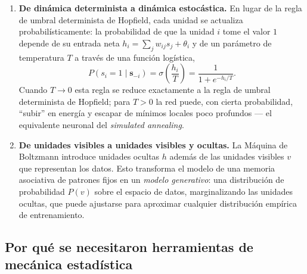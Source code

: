 \documentclass[12pt]{article}
\begin{document}
\begin{enumerate}
\item \textbf{De dinámica determinista a dinámica estocástica.} En lugar de la regla de umbral determinista de Hopfield, cada unidad se actualiza probabilísticamente: la probabilidad de que la unidad $i$ tome el valor $1$ depende de su entrada neta $h_i = \sum_j w_{ij}s_j + \theta_i$ y de un parámetro de temperatura $T$ a través de una función logística,
\begin{equation}
P(s_i = 1 \mid \mathbf{s}_{-i}) = \sigma\!\left(\frac{h_i}{T}\right) = \frac{1}{1+e^{-h_i/T}} .
\end{equation}
Cuando $T \to 0$ esta regla se reduce exactamente a la regla de umbral determinista de Hopfield; para $T>0$ la red puede, con cierta probabilidad, ``subir'' en energía y escapar de mínimos locales poco profundos --- el equivalente neuronal del \emph{simulated annealing}.
\item \textbf{De unidades visibles a unidades visibles y ocultas.} La Máquina de Boltzmann introduce unidades ocultas $h$ además de las unidades visibles $v$ que representan los datos. Esto transforma el modelo de una memoria asociativa de patrones fijos en un \emph{modelo generativo}: una distribución de probabilidad $P(v)$ sobre el espacio de datos, marginalizando las unidades ocultas, que puede ajustarse para aproximar cualquier distribución empírica de entrenamiento.
\end{enumerate}

\subsection{Por qué se necesitaron herramientas de mecánica estadística}
\end{document}
